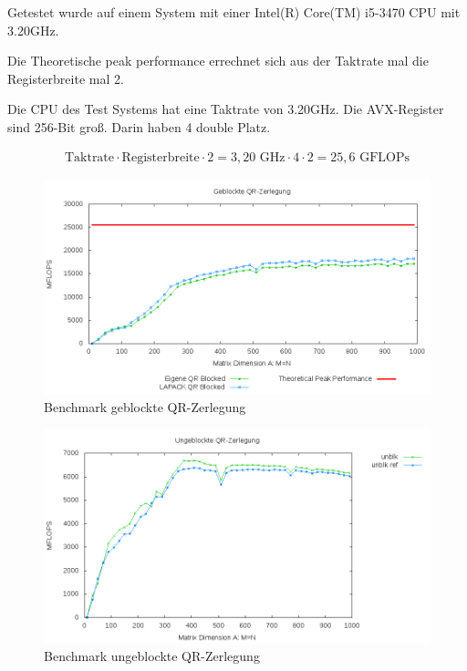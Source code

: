 Getestet wurde auf einem System mit einer Intel(R) Core(TM) i5-3470 CPU mit 3.20GHz. 

Die Theoretische peak performance errechnet sich aus der Taktrate mal die Registerbreite mal 2.

Die CPU des Test Systems hat eine Taktrate von 3.20GHz.
Die AVX-Register sind 256-Bit groß. Darin haben 4 double Platz.

\begin{align*}
	\text{Taktrate} \cdot \text{Registerbreite} \cdot 2= 3,20 \text{ GHz} \cdot 4 \cdot 2 = 25,6 \text{ GFLOPs}
\end{align*}

\begin{figure}[H]
	\includegraphics[width=\textwidth]{images/blk.png}
	\caption{Benchmark geblockte QR-Zerlegung}
	\label{img:blk}
\end{figure}

\begin{figure}[H]
	\includegraphics[width=\textwidth]{images/unblk.png}
	\caption{Benchmark ungeblockte QR-Zerlegung}
	\label{img:unblk}
\end{figure}








	 